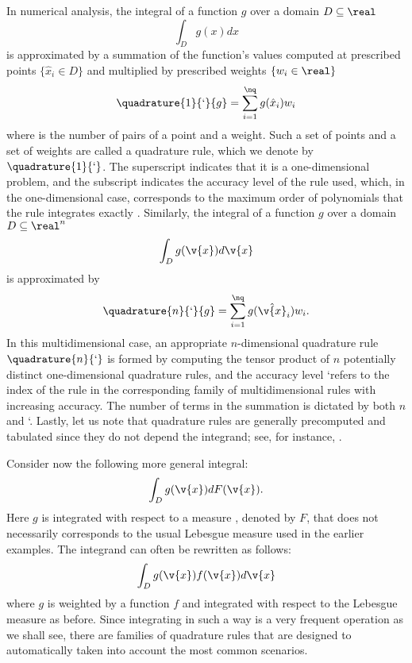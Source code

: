 In numerical analysis, the integral of a function $g$ over a domain $D \subseteq
\real$
\[
  \int_D g(x) dx
\]
is approximated by a summation of the function's values computed at prescribed
points $\{ \hat{x}_i \in D \}$ and multiplied by prescribed weights $\{ w_i \in
\real \}$
\[
  \quadrature{1}{\lq}{g} = \sum_{i = 1}^\nq g(\hat{x}_i) w_i
\]
where \nq is the number of pairs of a point and a weight. Such a set of points
and a set of weights are called a quadrature rule, which we denote by
$\quadrature{1}{\lq}$. The superscript indicates that it is a one-dimensional
problem, and the subscript indicates the accuracy level of the rule used, which,
in the one-dimensional case, corresponds to the maximum order of polynomials
that the rule integrates exactly \cite{heiss2008}. Similarly, the integral of a
function $g$ over a domain $D \subseteq \real^n$
\[
  \int_D g(\v{x}) d\v{x}
\]
is approximated by
\[
  \quadrature{n}{\lq}{g} = \sum_{i = 1}^\nq g(\hat{\v{x}}_i) w_i.
\]
In this multidimensional case, an appropriate $n$-dimensional quadrature rule
$\quadrature{n}{\lq}$ is formed by computing the tensor product of $n$
potentially distinct one-dimensional quadrature rules, and the accuracy level
\lq refers to the index of the rule in the corresponding family of
multidimensional rules with increasing accuracy. The number of terms in the
summation \nq is dictated by both $n$ and \lq. Lastly, let us note that
quadrature rules are generally precomputed and tabulated since they do not
depend the integrand; see, for instance, \cite{burkardt}.

Consider now the following more general integral:
\[
  \int_D g(\v{x}) dF(\v{x}).
\]
Here $g$ is integrated with respect to a measure \cite{durrett2010}, denoted by
$F$, that does not necessarily corresponds to the usual Lebesgue measure used in
the earlier examples. The integrand can often be rewritten as follows:
\[
  \int_D g(\v{x}) f(\v{x}) d\v{x}
\]
where $g$ is weighted by a function $f$ and integrated with respect to the
Lebesgue measure as before. Since integrating in such a way is a very frequent
operation as we shall see, there are families of quadrature rules that are
designed to automatically taken into account the most common scenarios.

